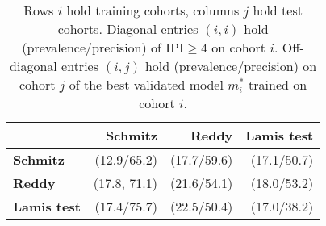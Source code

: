 \begin{table}[ht]
    \small
    \centering
    \begin{tabular}{lrrr}
        \hline
        & \textbf{Schmitz} & \textbf{Reddy} & \textbf{Lamis test} \\
        \hline
        \textbf{Schmitz} & (\num{12.9}/\num{65.2}) & (\num{17.7}/\num{59.6}) & (\num{17.1}/\num{50.7}) \\
        \textbf{Reddy} & (\num{17.8}, \num{71.1}) & (\num{21.6}/\num{54.1}) & (\num{18.0}/\num{53.2}) \\
        \textbf{Lamis test} & (\num{17.4}/\num{75.7}) & (\num{22.5}/\num{50.4}) & (\num{17.0}/\num{38.2}) \\
        \hline
    \end{tabular}
    \caption{Rows $i$ hold training cohorts, columns $j$ hold test cohorts. Diagonal 
        entries $(i, i)$ hold (prevalence/precision) of $\text{IPI} \geq 4$
        on cohort $i$. Off-diagonal entries $(i, j)$ hold (prevalence/precision) 
        on cohort $j$ of the best validated model $m^*_i$ trained on cohort $i$.}
    \label{tab:inter_trial}
\end{table}